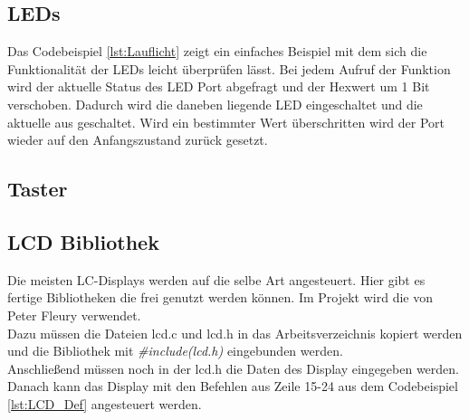 \subsection{LEDs}
Das Codebeispiel \ref{lst:Lauflicht} zeigt ein einfaches Beispiel mit dem sich die Funktionalität der LEDs leicht überprüfen lässt. Bei jedem Aufruf der Funktion wird der aktuelle Status des LED Port abgefragt und der Hexwert um 1 Bit verschoben. Dadurch wird die daneben liegende LED eingeschaltet und die aktuelle aus geschaltet. Wird ein bestimmter Wert überschritten wird der Port wieder auf den Anfangszustand zurück gesetzt.
\lstset{language=C, basicstyle=\footnotesize, showstringspaces=false, tabsize=2}

\subsection{Taster}
\lstset{language=C, basicstyle=\footnotesize, showstringspaces=false, tabsize=2}



\subsection{LCD Bibliothek}
Die meisten LC-Displays werden auf die selbe Art angesteuert. Hier gibt es fertige Bibliotheken die frei genutzt werden können. Im Projekt wird die von Peter Fleury\cite{uC:Fleury} verwendet.\\
Dazu müssen die Dateien lcd.c und lcd.h in das Arbeitsverzeichnis kopiert werden und die Bibliothek mit \emph{\#include(lcd.h)} eingebunden werden. \\
Anschließend müssen noch in der lcd.h die Daten des Display eingegeben werden.
Danach kann das Display mit den Befehlen aus Zeile 15-24 aus dem Codebeispiel \ref{lst:LCD_Def} angesteuert werden.

\lstset{language=C, basicstyle=\footnotesize, showstringspaces=false, tabsize=4}

